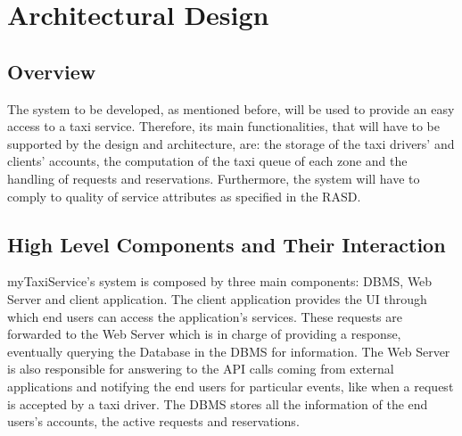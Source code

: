 \documentclass{article}
\begin{document}
\section{Architectural Design}
\subsection{Overview}
The system to be developed, as mentioned before, will be used to provide an easy access to a taxi service. Therefore, its main functionalities, that will have to be supported by the design and architecture, are: the storage of the taxi drivers' and clients' accounts, the computation of the taxi queue of each zone and the handling of requests and reservations. Furthermore, the system will have to comply to quality of service attributes as specified in the RASD\@.
\subsection{High Level Components and Their Interaction}
myTaxiService's system is composed by three main components: DBMS, Web Server and client application. The client application provides the UI through which end users can access the application's services. These requests are forwarded to the Web Server which is in charge of providing a response, eventually querying the Database in the DBMS for information. The Web Server is also responsible for answering to the API calls coming from external applications and notifying the end users for particular events, like when a request is accepted by a taxi driver. The DBMS stores all the information of the end users's accounts, the active requests and reservations. %
\end{document}
